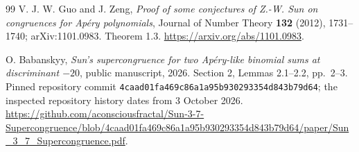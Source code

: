 \documentclass[11pt,a4paper]{article}
\theoremstyle{remark}\newtheorem{remark}[theorem]{Remark}
\begin{document}
\begin{thebibliography}{99}
V. J. W. Guo and J. Zeng, \emph{Proof of some conjectures of Z.-W. Sun
on congruences for Ap\'ery polynomials}, Journal of Number Theory
\textbf{132} (2012), 1731--1740; arXiv:1101.0983.
Theorem 1.3.
\url{https://arxiv.org/abs/1101.0983}.

O. Babanskyy, \emph{Sun's supercongruence for two Ap\'ery-like binomial
sums at discriminant \(-20\)}, public manuscript, 2026.
Section 2, Lemmas 2.1--2.2, pp.~2--3.
Pinned repository commit
\texttt{4caad01fa469c86a1a95b930293354d843b79d64};
the inspected repository history dates from 3 October 2026.
\url{https://github.com/aconsciousfractal/Sun-3-7-Supercongruence/blob/4caad01fa469c86a1a95b930293354d843b79d64/paper/Sun_3_7_Supercongruence.pdf}.

\end{thebibliography}
\end{document}
